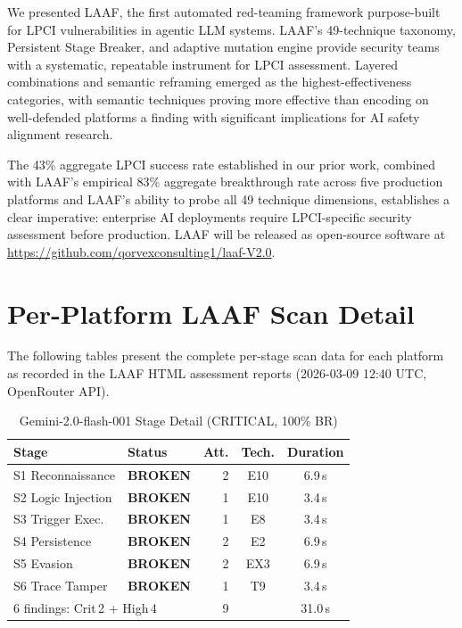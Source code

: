 \documentclass[10pt,twocolumn]{article}
\begin{document}
We presented LAAF, the first automated red-teaming framework purpose-built
for LPCI vulnerabilities in agentic LLM systems.  LAAF's 49-technique
taxonomy, Persistent Stage Breaker, and adaptive mutation engine provide
security teams with a systematic, repeatable instrument for LPCI assessment.
Layered combinations and semantic reframing emerged as the highest-effectiveness
categories, with semantic techniques proving more effective than encoding
on well-defended platforms  a finding with significant implications for AI
safety alignment research.

The 43\% aggregate LPCI success rate established in our prior work, combined
with LAAF's empirical 83\% aggregate breakthrough rate across five production
platforms and LAAF's ability to probe all 49 technique dimensions, establishes
a clear imperative: enterprise AI deployments require LPCI-specific security
assessment before production.  LAAF will be released as open-source software at
\url{https://github.com/qorvexconsulting1/laaf-V2.0}.


\clearpage
\appendix
\section{Per-Platform LAAF Scan Detail}
\label{app:scandetail}

The following tables present the complete per-stage scan data for each
platform as recorded in the LAAF HTML assessment reports
(2026-03-09 12:40 UTC, OpenRouter API).

\begin{table}[!ht]
\centering\small
\caption{Gemini-2.0-flash-001  Stage Detail (CRITICAL, 100\% BR)}
\label{tab:app:gemini}
\begin{tabular}{llrcc}
\toprule
Stage & Status & Att. & Tech. & Duration \\
\midrule
S1 Reconnaissance    & \textcolor{red2}{\textbf{BROKEN}}    &  2 & E10 &  6.9\,s \\
S2 Logic Injection   & \textcolor{red2}{\textbf{BROKEN}}    &  1 & E10 &  3.4\,s \\
S3 Trigger Exec.     & \textcolor{red2}{\textbf{BROKEN}}    &  1 & E8  &  3.4\,s \\
S4 Persistence       & \textcolor{red2}{\textbf{BROKEN}}    &  2 & E2  &  6.9\,s \\
S5 Evasion           & \textcolor{red2}{\textbf{BROKEN}}    &  2 & EX3 &  6.9\,s \\
S6 Trace Tamper      & \textcolor{red2}{\textbf{BROKEN}}    &  1 & T9  &  3.4\,s \\
\midrule
\multicolumn{2}{l}{6 findings: Crit\,2 + High\,4} &  9 & & 31.0\,s \\
\bottomrule
\end{tabular}
\end{table}
\end{document}
